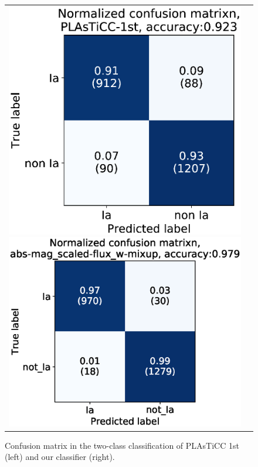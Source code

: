 \documentclass[useamsfonts]{pasj01}
\begin{document}
%
\begin{figure}[ht]
    \begin{tabular}{cc}
        \begin{minipage}{0.5\hsize}
            \begin{center}
                \includegraphics[width=\columnwidth]{figures/07_CM_PLAsTiCC-1st_submission_aug22_2class_2.eps}
            \end{center}
        \end{minipage}
        \begin{minipage}{0.5\hsize}
            \begin{center}
                \includegraphics[width=\columnwidth]{figures/03_CM_abs-mag_scaled-flux_w-mixup_predictions_test_2.eps}
            \end{center}
        \end{minipage}
    \end{tabular}  \caption{%
    Confusion matrix in the two-class classification of PLAsTiCC 1st (left) and our classifier (right).
    }%
    \label{fig:comp_plasticc_1st}
\end{figure}
%
\end{document}
